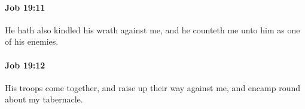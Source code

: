 		\paragraph{Job 19:11} %
			\label{JOB-19-11}

			He hath also kindled his wrath against me, and he counteth me unto him as one of his enemies.


		\paragraph{Job 19:12} %
			\label{JOB-19-12}

			His troops come together, and raise up their way against me, and encamp round about my tabernacle.


